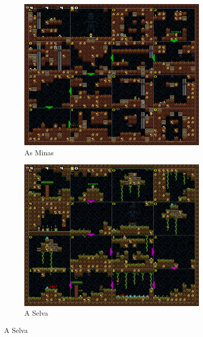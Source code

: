 \begin{figure}[H]
\centering
	\begin{subfigure}[b]{0.4\textwidth}
		\includegraphics[width=\textwidth]{fig/spelunky-mines-example.pdf}
		\caption{As Minas}
		\label{fig:spelunky-mines-example}
	\end{subfigure}
	\begin{subfigure}[b]{0.4\textwidth}
		\includegraphics[width=\textwidth]{fig/spelunky-jungle-example.pdf}
		\caption{A Selva}
		\label{fig:spelunky-jungle-example}
	\end{subfigure}


\end{figure}
